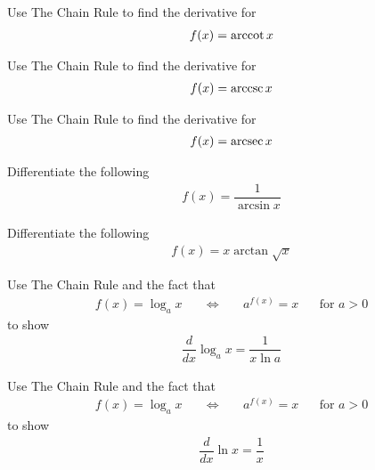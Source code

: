 \begin{exercise}
Use The Chain Rule to find the derivative for
\begin{align*}
    f(x) = \operatorname*{arccot} x
\end{align*}
\end{exercise}

\begin{exercise}
Use The Chain Rule to find the derivative for
\begin{align*}
    f(x) = \operatorname*{arccsc} x
\end{align*}
\end{exercise}

\begin{exercise}
Use The Chain Rule to find the derivative for
\begin{align*}
    f(x) = \operatorname*{arcsec} x
\end{align*}
\end{exercise}

\begin{exercise}
Differentiate the following
\begin{align*}
    f(x) = \dfrac{1}{\arcsin x}
\end{align*}
\end{exercise}

\begin{exercise}
Differentiate the following
\begin{align*}
    f(x) = x\arctan \sqrt{x}
\end{align*}
\end{exercise}

\begin{exercise}
Use The Chain Rule and the fact that 
\begin{align*}
f(x) = \log_{a} x \hspace{20pt} \Longleftrightarrow \hspace{20pt} a^{f(x)} = x \hspace{20pt} \text{for} \hspace{4pt} a>0
\end{align*}
to show
\begin{align*}
    \dfrac{d}{dx}\log_{a} x = \dfrac{1}{x \ln a}
\end{align*}
\end{exercise}

\begin{exercise}
Use The Chain Rule and the fact that 
\begin{align*}
f(x) = \log_{a} x \hspace{20pt} \Longleftrightarrow \hspace{20pt} a^{f(x)} = x \hspace{20pt} \text{for} \hspace{4pt} a>0
\end{align*}
to show
\begin{align*}
    \dfrac{d}{dx}\ln x = \dfrac{1}{x}
\end{align*}
\end{exercise}

